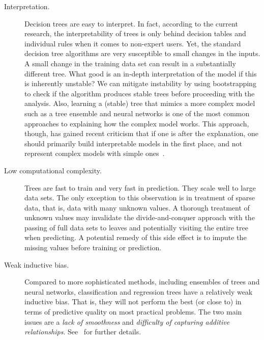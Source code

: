 \begin{refsection}
\begin{description}
\item[Interpretation.] Decision trees are easy to interpret. In fact, according to the current research, the interpretability of trees is only behind decision tables and individual rules when it comes to non-expert users. Yet, the standard decision tree algorithms are very susceptible to small changes in the inputs. A small change in the training data set can result in a substantially different tree. What good is an in-depth interpretation of the model if this is inherently unstable? We can mitigate instability by using bootstrapping to check if the algorithm produces stable trees before proceeding with the analysis. Also, learning a (stable) tree that mimics a more complex model such as a tree ensemble and neural networks is one of the most common approaches to explaining how the complex model works. This approach, though, has gained recent criticism that if one is after the explanation, one should primarily build interpretable models in the first place, and not represent complex models with simple ones~\citep{Rudin2019}.

\item[Low computational complexity.] Trees are fast to train and very fast in prediction. They scale well to large data sets. The only exception to this observation is in treatment of sparse data, that is, data with many unknown values. A thorough treatment of unknown values may invalidate the divide-and-conquer approach with the passing of full data sets to leaves and potentially visiting the entire tree when predicting. A potential remedy of this side effect is to impute the missing values before training or prediction.

\item[Weak inductive bias.] Compared to more sophisticated methods, including ensembles of trees and neural networks, classification and regression trees have a relatively weak inductive bias. That is, they will not perform the best (or close to) in terms of predictive quality on most practical problems. The two main issues are a {\em lack of smoothness} and {\em difficulty of capturing additive relationships}. See~\citep{ESL} for further details.


\end{description}
\end{refsection}
